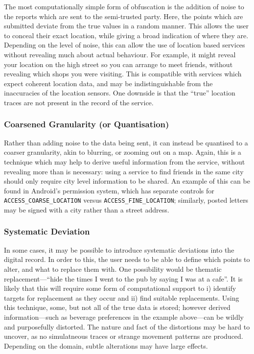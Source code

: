 \documentclass{IOS-Book-Article}     %
\newcommand{\tbox}[3][red]{{
\color{#1}\noindent{
   \fbox{\scriptsize{ {\bf #2} \textsl{#3}}}
   \vspace{2pt}
}
}}
\newcommand{\todo}[1]{\tbox{TODO:}{#1}}
\begin{document}
The most computationally simple form of obfuscation is the addition of noise to
the reports which are sent to the semi-trusted party. Here, the points which are
submitted deviate from the true values in a random manner. This allows the user
to conceal their exact location, while giving a broad indication of where they
are. Depending on the level of noise, this can allow the use of location
based services without revealing much about actual behaviour. For example, it
might reveal your location on the high street so you can arrange to meet
friends, without revealing which shops you were visiting. This is compatible
with services which expect coherent location data, and may be indistinguishable
from the inaccuracies of the location sensors. One downside is that the ``true''
location traces are not present in the record of the service.
\todo{examples?}

\subsubsection{Coarsened Granularity (or Quantisation)}

Rather than adding noise to the data being sent, it can instead be quantised to
a coarser granularity, akin to blurring, or zooming out on a map. Again, this is
a technique which may help to derive useful information from the service,
without revealing more than is necessary: using a service to find friends in the
same city should only require city level information to be shared. An example of
this can be found in Android's permission system, which has separate controls
for \verb|ACCESS_COARSE_LOCATION| versus \verb|ACCESS_FINE_LOCATION|; similarly,
posted letters may be signed with a city rather than a street address.

\subsubsection{Systematic Deviation}

In some cases, it may be possible to introduce systematic deviations into the
digital record. In order to this, the user needs to be able to define which
points to alter, and what to replace them with. One possibility would be
thematic replacement---``hide the times I went to the pub by saying I
was at a cafe''. It is likely that this will require some form of computational
support to i) identify targets for replacement as they occur and ii) find
suitable replacements. Using this technique, some, but not all of the true data
is stored; however derived information---such as beverage preferences in the
example above---can be wildly and purposefully distorted. The nature and fact of
the distortions may be hard to uncover, as no simulatneous traces or
strange movement patterns are produced. Depending on the domain, subtle
alterations may have large effects.
\todo{examples?}
\end{document}
